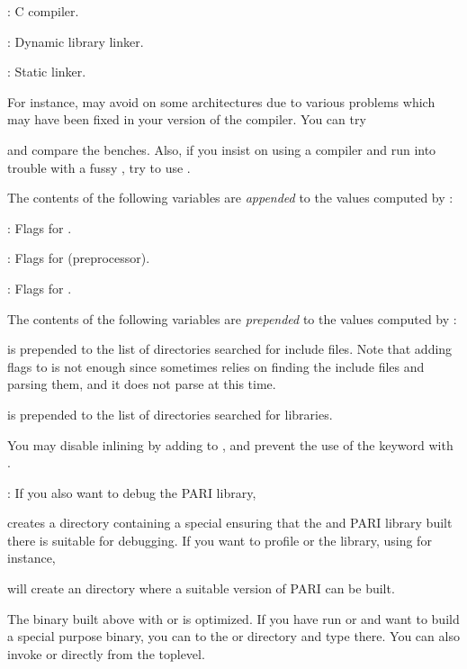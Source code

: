: C compiler.

: Dynamic library linker.

: Static linker.

\noindent For instance,  may avoid  on some
architectures due to various problems which may have been fixed in your
version of the compiler. You can try


\noindent and compare the benches. Also, if you insist on using a 
compiler and run into trouble with a fussy , try to use
.


\noindent The contents of the following variables are \emph{appended} to the
values computed by :

: Flags for .

: Flags for  (preprocessor).

: Flags for .

\noindent The contents of the following variables are \emph{prepended} to
the values computed by :

 is prepended to the list of directories
searched for include files. Note that adding  flags to
 is not enough since  sometimes
relies on finding the include files and parsing them, and it does not
parse  at this time.

 is prepended to the list of directories
searched for libraries.

\noindent You may disable inlining by adding  to
, and prevent the use of the  keyword with
.

: If you also want to debug the PARI library,


\noindent creates a directory  containing a special
 ensuring that the  and PARI library built there is
suitable for debugging. If you want to
profile  or the library, using  for instance,


\noindent will create an  directory where a suitable version
of PARI can be built.

The  binary built above with  or  is
optimized. If you have run  or  and want to build
a special purpose binary, you can  to the  or 
directory and type  there. You can also invoke 
or  directly from the toplevel.

